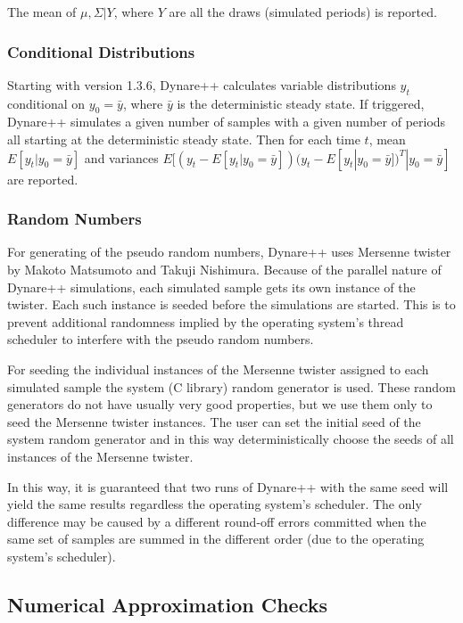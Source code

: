 \documentclass[10pt]{article}
\begin{document}
The mean of $\mu,\Sigma|Y$, where $Y$ are all the draws (simulated
periods) is reported.

\subsubsection{Conditional Distributions}
\label{cond_dist}

Starting with version 1.3.6, Dynare++ calculates variable
distributions $y_t$ conditional on $y_0=\bar y$, where $\bar y$ is the
deterministic steady state. If triggered, Dynare++ simulates a given
number of samples with a given number of periods all starting at
the deterministic steady state. Then for each time $t$, mean
$E[y_t|y_0=\bar y]$ and variances $E[(y_t-E[y_t|y_0=\bar
y])(y_t-E[y_t|y_0=\bar y])^T|y_0=\bar y]$ are reported.

\subsubsection{Random Numbers}
\label{random_numbers}

For generating of the pseudo random numbers, Dynare++ uses Mersenne
twister by Makoto Matsumoto and Takuji Nishimura. Because of the
parallel nature of Dynare++ simulations, each simulated sample gets
its own instance of the twister. Each such instance is seeded before
the simulations are started. This is to prevent additional randomness
implied by the operating system's thread scheduler to interfere with
the pseudo random numbers.

For seeding the individual instances of the Mersenne twister assigned
to each simulated sample the system (C library) random generator is
used. These random generators do not have usually very good
properties, but we use them only to seed the Mersenne twister
instances. The user can set the initial seed of the system random
generator and in this way deterministically choose the seeds of all
instances of the Mersenne twister.

In this way, it is guaranteed that two runs of Dynare++
with the same seed will yield the same results regardless the
operating system's scheduler. The only difference may be caused by a
different round-off errors committed when the same set of samples are
summed in the different order (due to the operating system's scheduler).

\subsection{Numerical Approximation Checks}
\label{checks}
\end{document}
